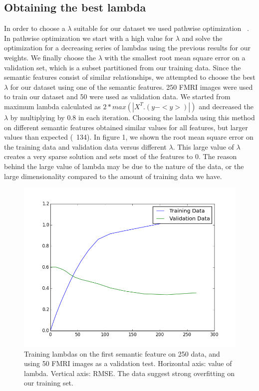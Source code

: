 \documentclass{article} %
\begin{document}
\subsection{Obtaining the best lambda}
In order to choose a $\lambda$ suitable for our dataset we used pathwise optimization ~\cite{friedman2010regularization}. In pathwise optimization we start with a high value for  $\lambda$ and solve the optimization for a decreasing series of lambdas using the previous results for our weights. We finally choose the $\lambda$ with the smallest root mean square error on a validation set, which is a subset partitioned from our training data. Since the semantic features consist of similar relationships, we attempted to choose the best $\lambda$ for our dataset using one of the semantic features. 250 FMRI images were used to train our dataset and 50 were used as validation data. We started from maximum lambda calculated as $2 * max (|X^T.(y - <y>)|)$ and decreased the $\lambda$ by multiplying by 0.8 in each iteration. Choosing the lambda using this method on different semantic features obtained similar values for all features, but larger values than expected (~134). In figure 1, we shown the root mean square error on the training data and validation data versus different $\lambda$. This large value of $\lambda$ creates a very sparse solution and sets most of the features to 0. The reason behind the large value of lambda may be due to the nature of the data, or the large dimensionality compared to the amount of training data we have.



\begin{figure}[h]
\begin{center}
\includegraphics[scale=0.5]{trainvalidlambda}
\end{center}
\caption{Training lambdas on the first semantic feature on 250 data, and using 50 FMRI
images as a validation test. Horizontal axis: value of lambda. Vertical axis: RMSE. The data suggest strong overfitting on our training set.}
\end{figure}
\end{document}
